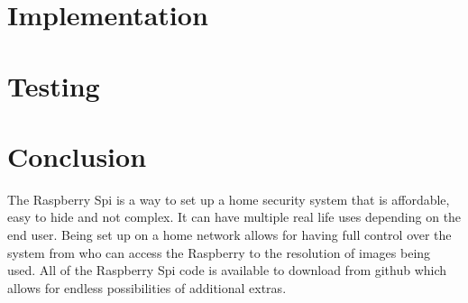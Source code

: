 \documentclass[]{report}   %
\begin{document}
%
%
\chapter {Implementation}
\label {ch:implem}
\chapter {Testing}
\label {ch:test}
%
%
%
%
%
\chapter {Conclusion}
\label {ch:concl}
%
%
%
%
%
\begin{small}
 The Raspberry Spi is a way to set up a home security system that is affordable, easy to hide and not complex. It can have multiple real life uses depending on the end user. Being set up on a home network allows for having full control over the system from who can access the Raspberry to the resolution of images being used. All of the Raspberry Spi code is available to download from github which allows for endless possibilities of additional extras.\\
\end{small}

\end{document}
